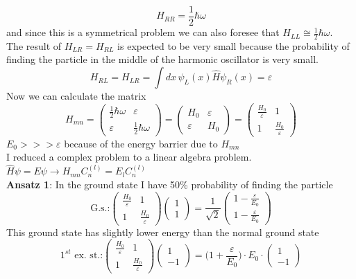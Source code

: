 \[
H_{RR}=\frac{1}{2}\hbar\omega
\]
and since this is a symmetrical problem we can also foresee that $H_{LL}\cong\frac{1}{2}\hbar\omega$.\\
The result of $H_{LR}=H_{RL}$ is expected to be very small because the probability of finding the particle in the middle of the harmonic oscillator is very small.
\[
H_{RL}=H_{LR}=\int dx\,\psi_L(x)\hat{H}\psi_R(x) = \varepsilon
\]
Now we can calculate the matrix
\[
H_{mn}=
\begin{pmatrix}
\frac{1}{2}\hbar\omega & \varepsilon\\
\varepsilon & \frac{1}{2}\hbar\omega
\end{pmatrix}
=
\begin{pmatrix}
H_0 & \varepsilon\\
\varepsilon & H_0
\end{pmatrix}
=
\begin{pmatrix}
\frac{H_0}{\varepsilon} & 1\\
1 & \frac{H_0}{\varepsilon}
\end{pmatrix}
\]
$E_0>>>\varepsilon$ because of the energy barrier due to $H_{mn}$\\
I reduced a complex problem to a linear algebra problem.\\
$\hat{H}\psi=E\psi \rightarrow H_{mn}C_n^{(l)}=E_lC_n^{(l)}$\\
\newline
\textbf{Ansatz 1}: In the ground state I have 50\% probability of finding the particle
\[
\text{G.s.:}
\begin{pmatrix}
\frac{H_0}{\varepsilon} & 1\\
1 & \frac{H_0}{\varepsilon}
\end{pmatrix}
\begin{pmatrix}
1\\1
\end{pmatrix}
=
\frac{1}{\sqrt{2}}
\begin{pmatrix}
1-\frac{\varepsilon}{E_0}\\1-\frac{\varepsilon}{E_0}
\end{pmatrix}
\]
This ground state has slightly lower energy than the normal ground state
\[
\text{$1^{st}$ ex. st.:}
\begin{pmatrix}
\frac{H_0}{\varepsilon} & 1\\
1 & \frac{H_0}{\varepsilon}
\end{pmatrix}
\begin{pmatrix}
1\\-1
\end{pmatrix}
=
\biggl(1+\frac{\varepsilon}{E_0}\biggr)\cdot E_0 \cdot
\begin{pmatrix}
1\\-1
\end{pmatrix}
\]
